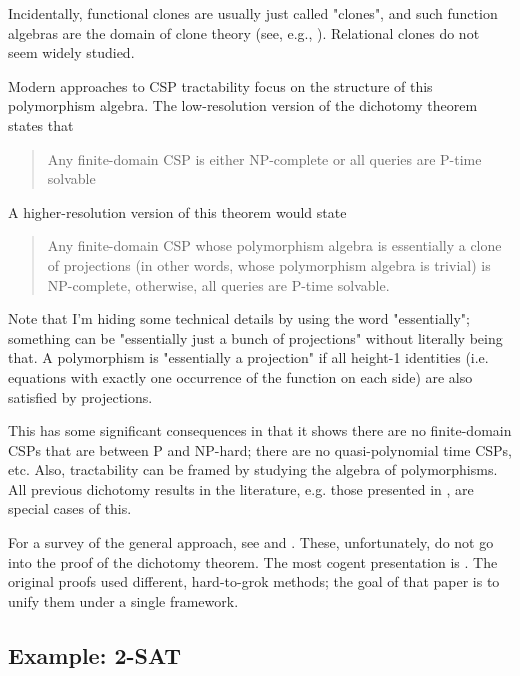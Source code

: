 \begin{remark}
Incidentally, functional clones are usually just called "clones", and such function algebras are the domain of clone theory (see, e.g., \citep{lau2006function}). Relational clones do not seem widely studied.
\end{remark}

Modern approaches to CSP tractability focus on the structure of this polymorphism algebra. The low-resolution version of the dichotomy theorem states that
\begin{quote}
    Any finite-domain CSP is either NP-complete or all queries are P-time solvable
\end{quote}

A higher-resolution version of this theorem would state

\begin{quote}
    Any finite-domain CSP whose polymorphism algebra is essentially a clone of projections (in other words, whose polymorphism algebra is trivial) is NP-complete, otherwise, all queries are P-time solvable.    
\end{quote}

\begin{remark}
Note that I’m hiding some technical details by using the word "essentially"; something can be "essentially just a bunch of projections" without literally being that. A polymorphism is "essentially a projection" if all height-1 identities (i.e. equations with exactly one occurrence of the function on each side) are also satisfied by projections.
\end{remark}

This has some significant consequences in that it shows there are no finite-domain CSPs that are between P and NP-hard; there are no quasi-polynomial time CSPs, etc. Also, tractability can be framed by studying the algebra of polymorphisms. All previous dichotomy results in the literature, e.g. those presented in \citep{grohe2006structure}, are special cases of this.

For a survey of the general approach, see \citep{brady2022notes} and \citep{barto2017polymorphisms}. These, unfortunately, do not go into the proof of the dichotomy theorem. The most cogent presentation is \citep{barto2021minimal}. The original proofs used different, hard-to-grok methods; the goal of that paper is to unify them under a single framework.

\subsection{Example: 2-SAT}\label{sec:2-sat-example}

